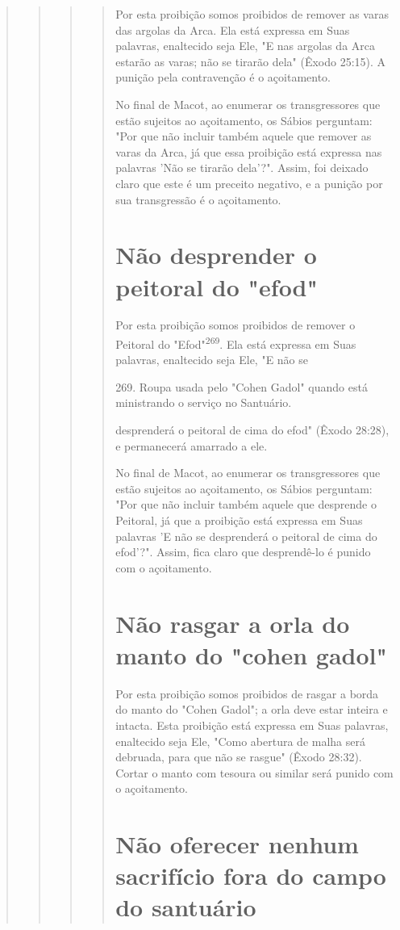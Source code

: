 \begin{quote}
\begin{quote}
\begin{quote}
\begin{quote}
Por esta proibição somos proibidos de remover as varas das argolas da
Arca. Ela está expressa em Suas palavras, enaltecido seja Ele, "E nas
argolas da Arca estarão as varas; não se tirarão dela" (Êxodo 25:15). A
punição pela con­travenção é o açoitamento.

No final de Macot, ao enumerar os transgressores que estão sujeitos ao
açoitamento, os Sábios perguntam: "Por que não incluir também aquele que
remover as varas da Arca, já que essa proibição está expressa nas
palavras 'Não se tirarão dela'?". Assim, foi deixado claro que este é um
preceito negativo, e a punição por sua transgressão é o açoitamento.

\section{Não desprender o peitoral do "efod"}

Por esta proibição somos proibidos de remover o Peitoral do
"Efod"\textsuperscript{269}. Ela está expressa em Suas palavras,
enaltecido seja Ele, "E não se

269. Roupa usada pelo "Cohen Gadol" quando está ministrando o serviço no
Santuário.

desprenderá o peitoral de cima do efod" (Êxodo 28:28), e permanecerá
amar­rado a ele.

No final de Macot, ao enumerar os transgressores que estão sujeitos ao
açoitamento, os Sábios perguntam: "Por que não incluir também aquele que
desprende o Peitoral, já que a proibição está expressa em Suas palavras
'E não se desprenderá o peitoral de cima do efod'?". Assim, fica claro
que desprendê-lo é punido com o açoitamento.

\section{Não rasgar a orla do manto do "cohen gadol"}

Por esta proibição somos proibidos de rasgar a borda do manto do "Cohen
Gadol"; a orla deve estar inteira e intacta. Esta proibição está
expressa em Suas palavras, enaltecido seja Ele, "Como abertura de malha
será debruada, para que não se rasgue" (Êxodo 28:32). Cortar o manto com
tesoura ou similar será punido com o açoitamento.

\section{Não oferecer nenhum sacrifício fora do campo do santuário}


\end{quote}
\end{quote}
\end{quote}
\end{quote}
